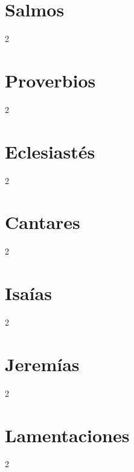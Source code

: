 \chapter{Salmos}
\begin{multicols}{2}
  \raggedcolumns
  \parskip=0pt \relax
  
\end{multicols}

\chapter{Proverbios}
\begin{multicols}{2}
  \raggedcolumns
  \parskip=0pt \relax
  
\end{multicols}

\chapter{Eclesiastés}
\begin{multicols}{2}
  \raggedcolumns
  \parskip=0pt \relax
  
\end{multicols}

\chapter{Cantares}
\begin{multicols}{2}
  \raggedcolumns
  \parskip=0pt \relax
  
\end{multicols}

\chapter{Isaías}
\begin{multicols}{2}
  \raggedcolumns
  \parskip=0pt \relax
  
\end{multicols}

\chapter{Jeremías}
\begin{multicols}{2}
  \raggedcolumns
  \parskip=0pt \relax
  
\end{multicols}

\chapter{Lamentaciones}
\begin{multicols}{2}
  \raggedcolumns
  \parskip=0pt \relax
  
\end{multicols}

